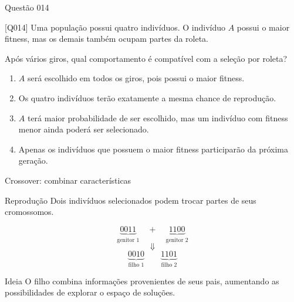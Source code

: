 \documentclass[xcolor=dvipsnames,table]{beamer}
\begin{document}
\begin{frame}{Questão 014}

    \begin{block}{[Q014]}
        Uma população possui quatro indivíduos. O indivíduo $A$
        possui o maior fitness, mas os demais também ocupam partes
        da roleta.

        Após vários giros, qual comportamento é compatível com
        a seleção por roleta?
    \end{block}

    \begin{enumerate}[label=(\Alph*)]

        \item $A$ será escolhido em todos os giros, pois possui
        o maior fitness.

        \item Os quatro indivíduos terão exatamente a mesma
        chance de reprodução.

        \item $A$ terá maior probabilidade de ser escolhido,
        mas um indivíduo com fitness menor ainda poderá ser selecionado.

        \item Apenas os indivíduos que possuem o maior fitness
        participarão da próxima geração.

    \end{enumerate}

\end{frame}

\begin{frame}[shrink]{Crossover: combinar características}

    \begin{block}{Reprodução}
        Dois indivíduos selecionados podem trocar partes
        de seus cromossomos.
    \end{block}

    \begin{center}
        \large
        \[
        \underbrace{0011}_{\text{genitor 1}}
        \quad+\quad
        \underbrace{1100}_{\text{genitor 2}}
        \]
        \[
        \Downarrow
        \]
        \[
        \underbrace{0010}_{\text{filho 1}}
        \qquad
        \underbrace{1101}_{\text{filho 2}}
        \]
    \end{center}

    \begin{block}{Ideia}
        O filho combina informações provenientes de seus pais,
        aumentando as possibilidades de explorar o espaço de soluções.
    \end{block}

\end{frame}
\end{document}
